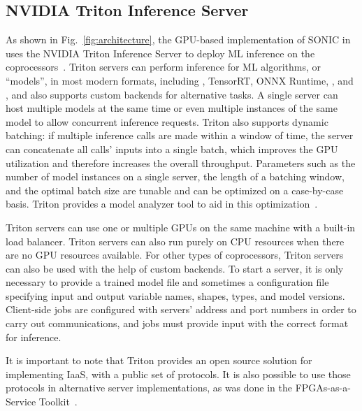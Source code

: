 \subsection{NVIDIA Triton Inference Server}
\label{sec:triton}

As shown in Fig.~\ref{fig:architecture}, the GPU-based implementation of SONIC in \CMSSW uses the NVIDIA Triton Inference Server to deploy ML inference on the coprocessors~\cite{triton, triton_readme}. Triton servers can perform inference for ML algorithms, or ``models'', in most modern formats, including \PYTORCH, TensorRT, ONNX Runtime, \TENSORFLOW, and \XGBOOST, and also supports custom backends for alternative tasks. A single server can host multiple models at the same time or even multiple instances of the same model to allow concurrent inference requests. Triton also supports dynamic batching: if multiple inference calls are made within a window of time, the server can concatenate all calls' inputs into a single batch, which improves the GPU utilization and therefore increases the overall throughput. Parameters such as the number of model instances on a single server, the length of a batching window, and the optimal batch size are tunable and can be optimized on a case-by-case basis. Triton provides a model analyzer tool to aid in this optimization~\cite{triton_model_analyzer}.

Triton servers can use one or multiple GPUs on the same machine with a built-in load balancer. Triton servers can also run purely on CPU resources when there are no GPU resources available. For other types of coprocessors, Triton servers can also be used with the help of custom backends. To start a server, it is only necessary to provide a trained model file and sometimes a configuration file specifying input and output variable names, shapes, types, and model versions. Client-side jobs are configured with servers' address and port numbers in order to carry out communications, and jobs must provide input with the correct format for inference.

It is important to note that Triton provides an open source solution for implementing IaaS, with a public set of protocols. It is also possible to use those protocols in alternative server implementations, as was done in the FPGAs-as-a-Service Toolkit~\cite{FaaST}.%


